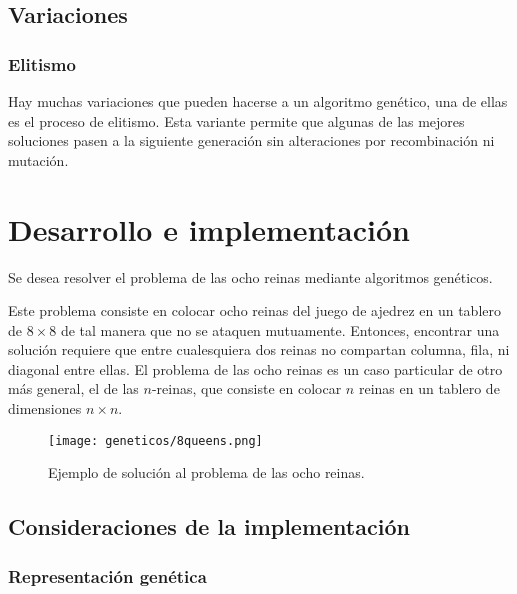 \subsection{Variaciones}

\subsubsection{Elitismo}

Hay muchas variaciones que pueden hacerse a un algoritmo genético, una de ellas es el proceso de elitismo. Esta variante permite que algunas de las mejores soluciones pasen a la siguiente generación sin alteraciones por recombinación ni mutación.


\section{Desarrollo e implementaci\'on}

Se desea resolver el problema de las ocho reinas mediante algoritmos genéticos.\par

Este problema consiste en colocar ocho reinas del juego de ajedrez en un tablero de \(8 \times 8\) de tal manera que no se ataquen mutuamente. Entonces, encontrar una solución requiere que entre cualesquiera dos reinas no compartan columna, fila, ni diagonal entre ellas. El problema de las ocho reinas es un caso particular de otro más general, el de las \(n\)-reinas, que consiste en colocar \(n\) reinas en un tablero de dimensiones \(n \times n\).

\begin{figure}[H]
  \centering
  \texttt{[image: geneticos/8queens.png]}
  \caption{Ejemplo de solución al problema de las ocho reinas. \protect\footnotemark}
  \label{fig:queens}
\end{figure}

\subsection{Consideraciones de la implementaci\'on}

\subsubsection{Representaci\'on gen\'etica}\par

